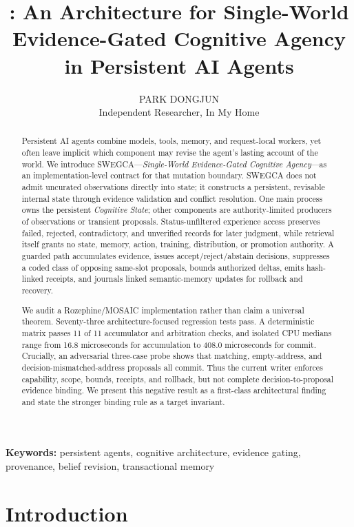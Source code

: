 \documentclass[10pt]{article}
\title{\swegca: An Architecture for Single-World Evidence-Gated Cognitive Agency in Persistent AI Agents}
\author{PARK DONGJUN\\\small Independent Researcher, In My Home}
\date{}
\newcommand{\swegca}{\textsc{SWEGCA}}
\newcommand{\cstate}{\textit{Cognitive State}}
\begin{document}
\maketitle

\begin{abstract}
Persistent AI agents combine models, tools, memory, and request-local workers, yet often leave implicit which component may revise the agent's lasting account of the world. We introduce \swegca---\emph{Single-World Evidence-Gated Cognitive Agency}---as an implementation-level contract for that mutation boundary. \swegca{} does not admit uncurated observations directly into state; it constructs a persistent, revisable internal state through evidence validation and conflict resolution. One main process owns the persistent \cstate; other components are authority-limited producers of observations or transient proposals. Status-unfiltered experience access preserves failed, rejected, contradictory, and unverified records for later judgment, while retrieval itself grants no state, memory, action, training, distribution, or promotion authority. A guarded path accumulates evidence, issues accept/reject/abstain decisions, suppresses a coded class of opposing same-slot proposals, bounds authorized deltas, emits hash-linked receipts, and journals linked semantic-memory updates for rollback and recovery.

We audit a Rozephine/MOSAIC implementation rather than claim a universal theorem. Seventy-three architecture-focused regression tests pass. A deterministic matrix passes 11 of 11 accumulator and arbitration checks, and isolated CPU medians range from 16.8 microseconds for accumulation to 408.0 microseconds for commit. Crucially, an adversarial three-case probe shows that matching, empty-address, and decision-mismatched-address proposals all commit. Thus the current writer enforces capability, scope, bounds, receipts, and rollback, but not complete decision-to-proposal evidence binding. We present this negative result as a first-class architectural finding and state the stronger binding rule as a target invariant.
\end{abstract}

\noindent\textbf{Keywords:} persistent agents, cognitive architecture, evidence gating, provenance, belief revision, transactional memory

\section{Introduction}
\end{document}

